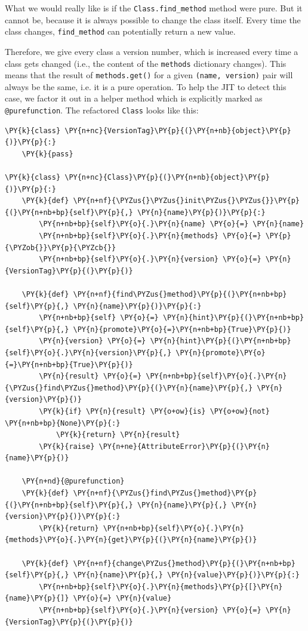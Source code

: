 \documentclass{sig-alternate}
\begin{document}
What we would really like is if the \texttt{Class.find\_method} method were pure.
But it cannot be, because it is always possible to change the class itself.
Every time the class changes, \texttt{find\_method} can potentially return a
new value.

Therefore, we give every class a version number, which is increased every time a
class gets changed (i.e., the content of the \texttt{methods} dictionary changes).
This means that the result of \texttt{methods.get()} for a given \texttt{(name,
version)} pair will always be the same, i.e. it is a pure operation.  To help
the JIT to detect this case, we factor it out in a helper method which is
explicitly marked as \texttt{@purefunction}. The refactored \texttt{Class} looks like
this:
\begin{Verbatim}[commandchars=\\\{\}]
\PY{k}{class} \PY{n+nc}{VersionTag}\PY{p}{(}\PY{n+nb}{object}\PY{p}{)}\PY{p}{:}
    \PY{k}{pass}

\PY{k}{class} \PY{n+nc}{Class}\PY{p}{(}\PY{n+nb}{object}\PY{p}{)}\PY{p}{:}
    \PY{k}{def} \PY{n+nf}{\PYZus{}\PYZus{}init\PYZus{}\PYZus{}}\PY{p}{(}\PY{n+nb+bp}{self}\PY{p}{,} \PY{n}{name}\PY{p}{)}\PY{p}{:}
        \PY{n+nb+bp}{self}\PY{o}{.}\PY{n}{name} \PY{o}{=} \PY{n}{name}
        \PY{n+nb+bp}{self}\PY{o}{.}\PY{n}{methods} \PY{o}{=} \PY{p}{\PYZob{}}\PY{p}{\PYZcb{}}
        \PY{n+nb+bp}{self}\PY{o}{.}\PY{n}{version} \PY{o}{=} \PY{n}{VersionTag}\PY{p}{(}\PY{p}{)}

    \PY{k}{def} \PY{n+nf}{find\PYZus{}method}\PY{p}{(}\PY{n+nb+bp}{self}\PY{p}{,} \PY{n}{name}\PY{p}{)}\PY{p}{:}
        \PY{n+nb+bp}{self} \PY{o}{=} \PY{n}{hint}\PY{p}{(}\PY{n+nb+bp}{self}\PY{p}{,} \PY{n}{promote}\PY{o}{=}\PY{n+nb+bp}{True}\PY{p}{)}
        \PY{n}{version} \PY{o}{=} \PY{n}{hint}\PY{p}{(}\PY{n+nb+bp}{self}\PY{o}{.}\PY{n}{version}\PY{p}{,} \PY{n}{promote}\PY{o}{=}\PY{n+nb+bp}{True}\PY{p}{)}
        \PY{n}{result} \PY{o}{=} \PY{n+nb+bp}{self}\PY{o}{.}\PY{n}{\PYZus{}find\PYZus{}method}\PY{p}{(}\PY{n}{name}\PY{p}{,} \PY{n}{version}\PY{p}{)}
        \PY{k}{if} \PY{n}{result} \PY{o+ow}{is} \PY{o+ow}{not} \PY{n+nb+bp}{None}\PY{p}{:}
            \PY{k}{return} \PY{n}{result}
        \PY{k}{raise} \PY{n+ne}{AttributeError}\PY{p}{(}\PY{n}{name}\PY{p}{)}

    \PY{n+nd}{@purefunction}
    \PY{k}{def} \PY{n+nf}{\PYZus{}find\PYZus{}method}\PY{p}{(}\PY{n+nb+bp}{self}\PY{p}{,} \PY{n}{name}\PY{p}{,} \PY{n}{version}\PY{p}{)}\PY{p}{:}
        \PY{k}{return} \PY{n+nb+bp}{self}\PY{o}{.}\PY{n}{methods}\PY{o}{.}\PY{n}{get}\PY{p}{(}\PY{n}{name}\PY{p}{)}

    \PY{k}{def} \PY{n+nf}{change\PYZus{}method}\PY{p}{(}\PY{n+nb+bp}{self}\PY{p}{,} \PY{n}{name}\PY{p}{,} \PY{n}{value}\PY{p}{)}\PY{p}{:}
        \PY{n+nb+bp}{self}\PY{o}{.}\PY{n}{methods}\PY{p}{[}\PY{n}{name}\PY{p}{]} \PY{o}{=} \PY{n}{value}
        \PY{n+nb+bp}{self}\PY{o}{.}\PY{n}{version} \PY{o}{=} \PY{n}{VersionTag}\PY{p}{(}\PY{p}{)}
\end{Verbatim}
\end{document}

